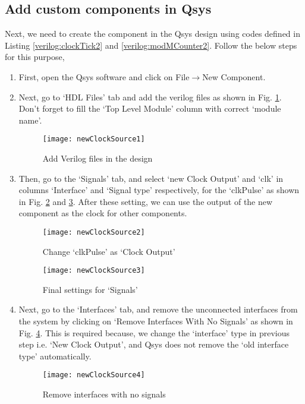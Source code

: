 


\subsection{Add custom components in Qsys}
Next, we need to create the component in the Qsys design using codes defined in Listing \ref{verilog:clockTick2} and \ref{verilog:modMCounter2}. Follow the below steps for this purpose, 

\begin{enumerate}
	\item First, open the Qsys software and click on File$\rightarrow$New Component.
	\item Next, go to `HDL Files' tab and add the verilog files as shown in Fig. \ref{fig:newClockSource1}. Don't forget to fill the `Top Level Module' column with correct `module name'.
	\begin{figure}[!h]
		\centering
		\texttt{[image: newClockSource1]}
		\caption{Add Verilog files in the design}
		\label{fig:newClockSource1}
	\end{figure}
	
	\item Then, go to the `Signals' tab, and select `new Clock Output' and `clk' in columns `Interface' and `Signal type' respectively, for the `clkPulse' as shown in Fig. \ref{fig:newClockSource2} and \ref{fig:newClockSource3}. After these setting, we can use the output of the new component as the clock for other components.
	
	\begin{figure}[!h]
		\centering
		\texttt{[image: newClockSource2]}
		\caption{Change `clkPulse' as `Clock Output'}
		\label{fig:newClockSource2}
	\end{figure}
	\begin{figure}[!h]
		\centering
		\texttt{[image: newClockSource3]}
		\caption{Final settings for `Signals'}
		\label{fig:newClockSource3}
	\end{figure} 
	
	\item Next, go to the `Interfaces' tab, and remove the unconnected interfaces from the system by clicking on `Remove Interfaces With No Signals' as shown in Fig. \ref{fig:newClockSource4}. This is required because, we change the `interface' type in previous step i.e. `New Clock Output', and Qsys does not remove the `old interface type' automatically.
	\begin{figure}[!h]
		\centering
		\texttt{[image: newClockSource4]}
		\caption{Remove interfaces with no signals}
		\label{fig:newClockSource4}
	\end{figure} 
	

\end{enumerate}
